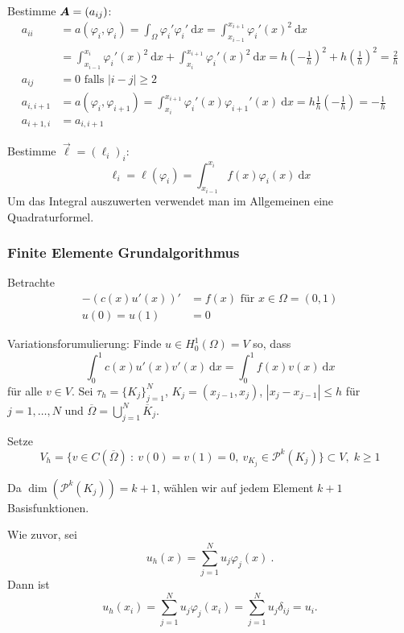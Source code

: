 \vspace{1em}
Bestimme $\boldsymbol{A} = (a_{ij})$:
\begin{align*}
    a_{ii} &= a(\varphi_i, \varphi_i) = \int_\Omega \varphi_i' \varphi_i' \ \mathrm dx
        = \int_{x_{i-1}}^{x_{i+1}} \varphi_i'(x)^2 \ \mathrm dx \\
        &= \int_{x_{i-1}}^{x_i} \varphi_i'(x)^2 \ \mathrm dx + \int_{x_i}^{x_{i+1}} \varphi_i'(x)^2 \ \mathrm dx
        = h \left(- \frac 1 h \right)^2 + h \left(\frac 1 h\right)^2 = \frac 2 h \\
    a_{ij} &= 0 \text{ falls } |i-j| \geq 2 \\
        a_{i, i+1} &= a(\varphi_i, \varphi_{i+1}) = \int_{x_i}^{x_{i+1}} \varphi_i'(x) \varphi_{i+1}'(x) \ \mathrm dx
        = h \frac 1 h \left( - \frac 1 h \right) = - \frac 1 h \\
    a_{i+1, i} &= a_{i, i+1}
\end{align*}

\vspace{1em} Bestimme $\vec \ell = (\ell_i)_i$:
\[
    \ell_i = \ell(\varphi_i) = \int_{x_{i-1}}^{x_i} f(x) \varphi_i(x) \ \mathrm dx
\]
Um das Integral auszuwerten verwendet man im Allgemeinen eine Quadraturformel.

\subsubsection*{Finite Elemente Grundalgorithmus}

Betrachte
\begin{align*}
    - \left( c(x) u'(x) \right)' &= f(x) \text{ für } x \in \Omega = (0,1) \\
    u(0) = u(1) &= 0
\end{align*}

Variationsforumulierung: Finde $u \in H_0^1(\Omega) = V$ so, dass
\[
    \int_0^1 c(x) u'(x) v'(x) \ \mathrm dx = \int_0^1 f(x) v(x) \ \mathrm dx
\]
für alle $v \in V$.
Sei $\tau_h = \{ K_j \}_{j=1}^N$, $K_j = (x_{j-1}, x_j)$, $|x_j - x_{j-1}| \leq h$ für $j = 1, \ldots, N$ und
$\overline \Omega = \bigcup_{j=1}^N \overline K_j$.

Setze
\[
    V_h = \{ v \in C(\overline \Omega) \ : \ v(0) = v(1) = 0, \ v_{K_j} \in \mathcal P^k(K_j) \} \subset V, \; k \geq 1
\]

Da $\dim( \mathcal P^k(K_j)) = k+1$, wählen wir auf jedem Element $k+1$ Basisfunktionen.

Wie zuvor, sei 
\[
    u_h(x) = \sum_{j=1}^N u_j \varphi_j(x) \ .
\]
Dann ist
\[
    u_h(x_i) = \sum_{j=1}^N u_j \varphi_j(x_i) = \sum_{j=1}^N u_j \delta_{ij} = u_i .
\]

